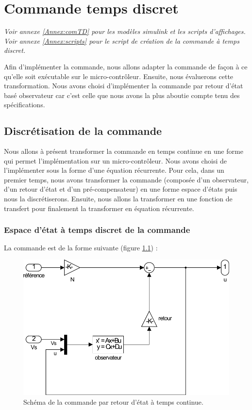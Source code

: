 \chapter{Commande temps discret}\label{chap:Command}
\begin{center}
\textit{Voir annexe \ref{Annex:comTD} pour les modèles simulink et les scripts d'affichages.\\
Voir annexe \ref{Annex:scripts} pour le script de création de la commande à temps discret.}
\end{center}
Afin d'implémenter la commande, nous allons adapter la commande de façon à ce qu'elle soit exécutable sur le micro-contrôleur. Ensuite, nous évaluerons cette transformation. Nous avons choisi d'implémenter la commande par retour d'état basé observateur car c'est celle que nous avons la plus aboutie compte tenu des spécifications. 
\section{Discrétisation de la commande}
Nous allons à présent transformer la commande en temps continue en une forme qui permet l'implémentation sur un micro-contrôleur. Nous avons choisi de l'implémenter sous la forme d'une équation récurrente. Pour cela, dans un premier temps, nous avons transformer la commande (composée d'un observateur, d'un retour d'état et d'un pré-compensateur) en une forme espace d'états puis nous la discrétiserons. Ensuite, nous allons la transformer en une fonction de transfert pour finalement la transformer en équation récurrente.
	\subsection{Espace d'état à temps discret de la commande}
La commande est de la forme suivante (figure \ref{fig:comTC}) : 
\begin{figure}[!ht]
\centering
\includegraphics[width=.4\textwidth]{./V/images/Com_asserv.pdf}
\caption{\label{fig:comTC}Schéma de la commande par retour d'état à temps continue.}
\end{figure}


